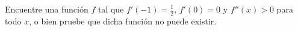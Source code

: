 \item Encuentre una función $f$ tal que $f'(-1) = \frac{1}{2}$, $f'(0) = 0$ y $f''(x) > 0$ para todo $x$, o bien pruebe que dicha función no puede existir.
